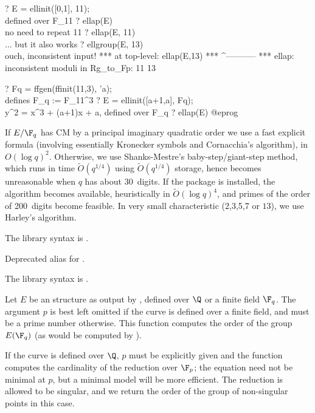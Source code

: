 ? E = ellinit([0,1], 11);  \\ defined over F_11
? ellap(E)       \\ no need to repeat 11
? ellap(E, 11)   \\ ... but it also works
? ellgroup(E, 13) \\ ouch, inconsistent input!
   ***   at top-level: ellap(E,13)
   ***                 ^-----------
   *** ellap: inconsistent moduli in Rg_to_Fp:
     11
     13

? Fq = ffgen(ffinit(11,3), 'a); \\ defines F_q := F_{11^3}
? E = ellinit([a+1,a], Fq);  \\ y^2 = x^3 + (a+1)x + a, defined over F_q
? ellap(E)
@eprog

 If $E/\F_q$ has CM by a principal imaginary
quadratic order we use a fast explicit formula (involving essentially Kronecker
symbols and Cornacchia's algorithm), in $O(\log q)^2$.
Otherwise, we use Shanks-Mestre's baby-step/giant-step method, which runs in
time $\tilde{O}(q^{1/4})$ using $\tilde{O}(q^{1/4})$ storage, hence becomes
unreasonable when $q$ has about 30~digits. If the  package is
installed, the  algorithm becomes available, heuristically in
$\tilde{O}(\log q)^4$, and primes of the order of 200~digits become feasible.
In very small characteristic (2,3,5,7 or $13$), we use Harley's algorithm.

The library syntax is .

\label{se:ellbil}
Deprecated alias for .

The library syntax is .

\label{se:ellcard}
Let $E$ be an  structure as output by , defined over
$\Q$ or a finite field $\F_q$. The argument $p$ is best left omitted if the
curve is defined over a finite field, and must be a prime number otherwise.
This function computes the order of the group $E(\F_q)$ (as would be
computed by ).

If the curve is defined over $\Q$, $p$ must be explicitly given and the
function computes the cardinality of the reduction over $\F_p$; the
equation need not be minimal at $p$, but a minimal model will be more
efficient. The reduction is allowed to be singular, and we return the order
of the group of non-singular points in this case.

